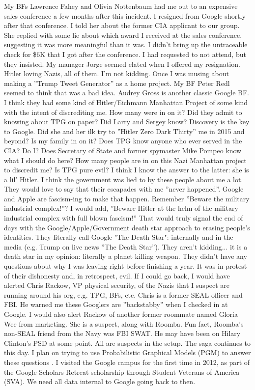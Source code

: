 \documentclass{article}
\begin{document}
\begin{multicols}{2}
My BFs Lawrence Fahey and Olivia Nottenbaum had me out to an expensive sales conference a few months after this incident. I resigned from Google shortly after that conference. I told her about the former CIA applicant to our group. She replied with some lie about which award I received at the sales conference, suggesting it was more meaningful than it was. I didn't bring up the untraceable check for \$6K that I got after the conference. I had requested to not attend, but they insisted. My manager Jorge seemed elated when I offered my resignation. Hitler loving Nazis, all of them. I'm not kidding. Once I was musing about making a ''Trump Tweet Generator'' as a home project. My BF Peter Redl seemed to think that was a bad idea. Audrey Gross is another classic Google BF. I think they had some kind of Hitler/Eichmann Manhattan Project of some kind with the intent of discrediting me. How many were in on it? Did they admit to knowing about TPG on paper? Did Larry and Sergey know? Discovery is the key to Google. Did she and her ilk try to ''Hitler Zero Dark Thirty'' me in 2015 and beyond? Is my family in on it? Does TPG know anyone who ever served in the CIA? Do I? Does Secretary of State and former spymaster Mike Pompeo know what I should do here? How many people are in on this Nazi Manhattan project to discredit me? Is TPG pure evil? I think I know the answer to the latter: she is a lil' Hitler. I think the government was lied to by these people about me a lot. They would love to say that their escapades with me ''never happened''. Google and Apple are fascism-ing to make that happen. Remember ''Beware the military industrial complex!''? I would add, ''Beware Hitler at the helm of the military industrial complex with full blown fascism!'' That would truly signal the end of days with the Google/Apple/Government death star approach to erasing people's identities. They literally call Google "The Death Star": internally and in the media (e.g. Trump on live news ''The Death Star''). They aren't kidding... it is a death star in my opinion: literally a planet killing weapon. They didn't have any questions about why I was leaving right before finishing a year. It was in protest of their dishonesty and, in retrospect, evil. If I could go back, I would have alerted Chris Rackow, VP physical security, of the Nazis that I suspect are running around his org, e.g. TPG, BFs, etc. Chris is a former SEAL officer and FBI. He warned me these Googlers are ''backstabby'' when I checked in at Google. I would also alert Rackow of another former roommate named Gloria Wee from marketing. She is a suspect, along with Roomba. Fun fact, Roomba's non-SEAL friend from the Navy was FBI SWAT. He may have been on Hilary Clinton's PSD at some point. All are suspects in the setup. The saga continues to this day. I plan on trying to use Probabilistic Graphical Models (PGM) to answer these questions \cite{probabilisticgraphicalmodels}. I visited the Google campus for the first time in 2012, as part of the Google Scholars Retreat scholarship through Student Veterans of America (SVA). We need all data internal to Google going back to then.


\end{multicols}
\end{document}
